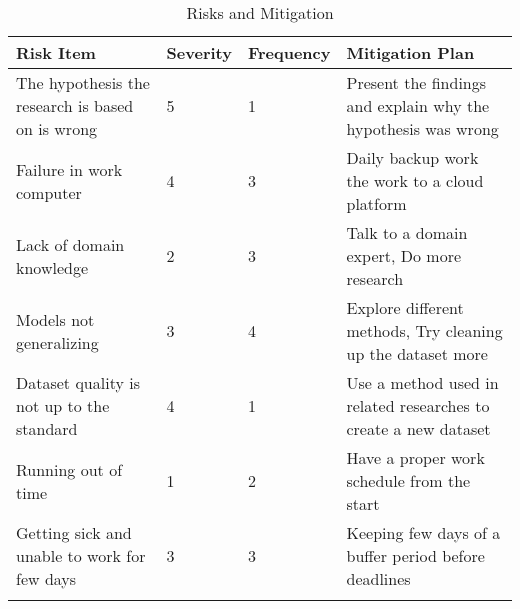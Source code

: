 \begin{longtable}{|p{4cm}|p{2cm}|p{2cm}|p{7cm}|}
    \hline
    \textbf{Risk Item} & 
    \textbf{Severity} & 
    \textbf{Frequency} & 
    \textbf{Mitigation Plan}
    \\ \hline
    
    The hypothesis the research is based on is wrong & 
    5 & 
    1 & 
    Present the findings and explain why the hypothesis was wrong 
    \\ \hline
    
    Failure in work computer & 
    4 & 
    3 & 
    Daily backup work the work to a cloud platform 
    \\ \hline
    
    Lack of domain knowledge & 
    2 & 
    3 & 
    Talk to a domain expert, Do more research 
    \\ \hline
    
    Models not generalizing & 
    3 & 
    4 & 
    Explore different methods, Try cleaning up the dataset more 
    \\ \hline
    
    Dataset quality is not up to the standard & 
    4 & 
    1 & 
    Use a method used in related researches to create a new dataset 
    \\ \hline
    
    Running out of time & 
    1 & 
    2 & 
    Have a proper work schedule from the start 
    \\ \hline
    
    Getting sick and unable to work for few days & 
    3 & 
    3 & 
    Keeping few days of a buffer period before deadlines 
    \\ \hline
    \caption{Risks and Mitigation}
\end{longtable}